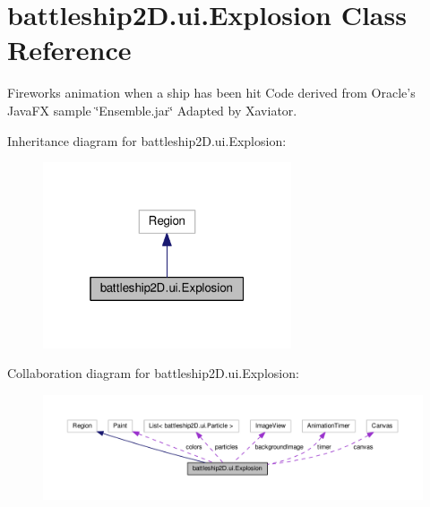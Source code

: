 \hypertarget{classbattleship2D_1_1ui_1_1Explosion}{\section{battleship2\-D.\-ui.\-Explosion Class Reference}
\label{classbattleship2D_1_1ui_1_1Explosion}
}


Fireworks animation when a ship has been hit Code derived from Oracle's Java\-F\-X sample \char`\"{}\-Ensemble.\-jar\char`\"{} Adapted by Xaviator.  




Inheritance diagram for battleship2\-D.\-ui.\-Explosion\-:\nopagebreak
\begin{figure}[H]
\begin{center}
\leavevmode
\includegraphics[width=208pt]{classbattleship2D_1_1ui_1_1Explosion__inherit__graph}
\end{center}
\end{figure}


Collaboration diagram for battleship2\-D.\-ui.\-Explosion\-:\nopagebreak
\begin{figure}[H]
\begin{center}
\leavevmode
\includegraphics[width=350pt]{classbattleship2D_1_1ui_1_1Explosion__coll__graph}
\end{center}
\end{figure}
